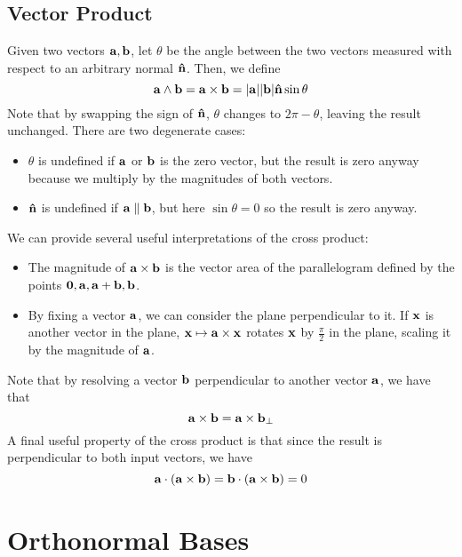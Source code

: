 \documentclass{article}
\begin{document}
\subsection{Vector Product}
\begin{definition}
    Given two vectors $\vb a, \vb b$, let $\theta$ be the angle between the two vectors measured with respect to an arbitrary normal $\vb{\hat n}$. Then, we define
    \[ \vb a \wedge \vb b = \vb a \times \vb b = \abs{\vb a} \abs{\vb b} \vb{\hat n} \sin \theta \]
    Note that by swapping the sign of $\vb{\hat n}$, $\theta$ changes to $2 \pi - \theta$, leaving the result unchanged. There are two degenerate cases:
    \begin{itemize}
        \item $\theta$ is undefined if $\vb a$ or $\vb b$ is the zero vector, but the result is zero anyway because we multiply by the magnitudes of both vectors.
        \item $\vb{\hat n}$ is undefined if $\vb a \parallel \vb b$, but here $\sin \theta = 0$ so the result is zero anyway.
    \end{itemize}
\end{definition}
We can provide several useful interpretations of the cross product:
\begin{itemize}
    \item The magnitude of $\vb a \times \vb b$ is the vector area of the parallelogram defined by the points $\vb 0, \vb a, \vb a + \vb b, \vb b$.
    \item By fixing a vector $\vb a$, we can consider the plane perpendicular to it. If $\vb x$ is another vector in the plane, $\vb x \mapsto \vb a \times \vb x$ rotates $\vb x$ by $\frac{\pi}{2}$ in the plane, scaling it by the magnitude of $\vb a$.
\end{itemize}
Note that by resolving a vector $\vb b$ perpendicular to another vector $\vb a$, we have that
\[ \vb a \times \vb b = \vb a \times \vb b_\perp \]
A final useful property of the cross product is that since the result is perpendicular to both input vectors, we have
\[ \vb a \cdot (\vb a \times \vb b) = \vb b \cdot(\vb a \times \vb b) = 0 \]

\section{Orthonormal Bases}
\end{document}
